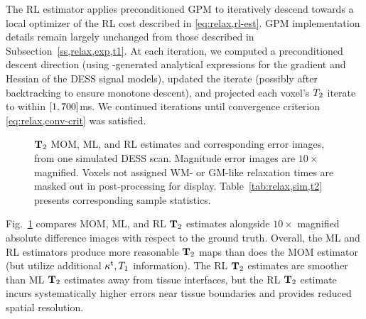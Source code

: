 The RL estimator applies preconditioned GPM
to iteratively descend towards a local optimizer
of the RL cost 
described in \eqref{eq:relax,rl-est}.
GPM implementation details
remain largely unchanged 
from those described 
in Subsection~\ref{ss,relax,exp,t1}.
At each iteration,
we computed a preconditioned descent direction
(using \matlab-generated analytical expressions
for the gradient and Hessian
of the DESS signal models),
updated the iterate
(possibly after backtracking 
to ensure monotone descent),
and projected each voxel's $T_2$ iterate
to within $\brac{1,700}$ms.
We continued iterations
until convergence criterion \eqref{eq:relax,conv-crit}
was satisfied.

\begin{figure}[!t]
	\centering
	\hspace{0cm}
	\caption{%
		$\mathbf{T}_2$ MOM, ML, and RL estimates
		and corresponding error images,
		from one simulated DESS scan.
		Magnitude error images are $10\times$ magnified.
		Voxels not assigned WM- or GM-like relaxation times
		are masked out in post-processing for display.
		Table~\ref{tab:relax,sim,t2} 
		presents corresponding sample statistics.
	}
	\label{fig:relax,sim,t2}
\end{figure}

Fig.~\ref{fig:relax,sim,t2} compares
MOM, ML, and RL $\mathbf{T}_2$ estimates
alongside $10\times$ magnified absolute difference images 
with respect to the ground truth.
Overall, 
the ML and RL estimators 
produce more reasonable $\mathbf{T}_2$ maps
than does the MOM estimator
(but utilize additional $\kappa^{\mathrm{t}},T_1$ information).
The RL $\mathbf{T}_2$ estimates are smoother
than ML $\mathbf{T}_2$ estimates 
away from tissue interfaces,
but the RL $\mathbf{T}_2$ estimate incurs 
systematically higher errors 
near tissue boundaries
and provides reduced spatial resolution.

